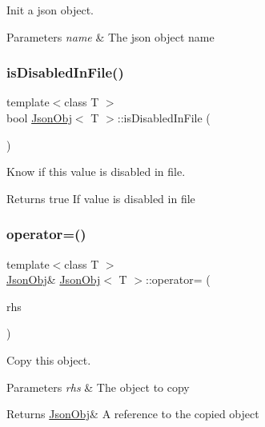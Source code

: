 Init a json object. 


\begin{DoxyParams}{Parameters}
{\em name} & The json object name \\
\hline
\end{DoxyParams}
\mbox{\label{class_json_obj_a4c549fb187f09fb3a0b43275f0b911bf}} 
\subsubsection{\texorpdfstring{is\+Disabled\+In\+File()}{isDisabledInFile()}}
{\footnotesize\ttfamily template$<$class T $>$ \\
bool \hyperlink{class_json_obj}{Json\+Obj}$<$ T $>$\+::is\+Disabled\+In\+File (\begin{DoxyParamCaption}{ }\end{DoxyParamCaption})\hspace{0.3cm}{\ttfamily [inline]}}



Know if this value is disabled in file. 

\begin{DoxyReturn}{Returns}
true If value is disabled in file 
\end{DoxyReturn}
\mbox{\label{class_json_obj_a8cfe5f37bfa374057419efb1f4cc644c}} 
\subsubsection{\texorpdfstring{operator=()}{operator=()}}
{\footnotesize\ttfamily template$<$class T $>$ \\
\hyperlink{class_json_obj}{Json\+Obj}\& \hyperlink{class_json_obj}{Json\+Obj}$<$ T $>$\+::operator= (\begin{DoxyParamCaption}\item[{\hyperlink{class_json_obj}{Json\+Obj}$<$ T $>$ const \&}]{rhs }\end{DoxyParamCaption})\hspace{0.3cm}{\ttfamily [inline]}}



Copy this object. 


\begin{DoxyParams}{Parameters}
{\em rhs} & The object to copy \\
\hline
\end{DoxyParams}
\begin{DoxyReturn}{Returns}
\hyperlink{class_json_obj}{Json\+Obj}\& A reference to the copied object 
\end{DoxyReturn}
\mbox{\label{class_json_obj_aff6a1003a4df81f1f006ec7fce81e1be}} 
